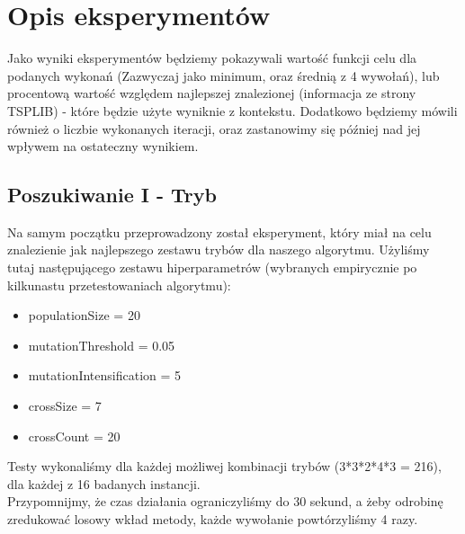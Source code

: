 \documentclass{article}
\begin{document}
\section{Opis eksperymentów}
Jako wyniki eksperymentów będziemy pokazywali wartość funkcji celu dla podanych wykonań (Zazwyczaj jako minimum, oraz średnią z 4 wywołań), lub procentową wartość względem najlepszej znalezionej (informacja ze strony TSPLIB) - które będzie użyte wyniknie z kontekstu. Dodatkowo będziemy mówili również o liczbie wykonanych iteracji, oraz zastanowimy się później nad jej wpływem na ostateczny wynikiem.

\subsection{Poszukiwanie I - Tryb}
Na samym początku przeprowadzony został eksperyment, który miał na celu znalezienie jak najlepszego zestawu trybów dla naszego algorytmu. Użyliśmy tutaj następującego zestawu hiperparametrów (wybranych empirycznie po kilkunastu przetestowaniach algorytmu):
\begin{itemize}
	\item populationSize = 20
	\item mutationThreshold = 0.05
	\item mutationIntensification = 5
	\item crossSize = 7
	\item crossCount = 20
\end{itemize}
Testy wykonaliśmy dla każdej możliwej kombinacji trybów (3*3*2*4*3 = 216), dla każdej z 16 badanych instancji.\\
Przypomnijmy, że czas działania ograniczyliśmy do 30 sekund, a żeby odrobinę zredukować losowy wkład metody, każde wywołanie powtórzyliśmy 4 razy.
\end{document}
